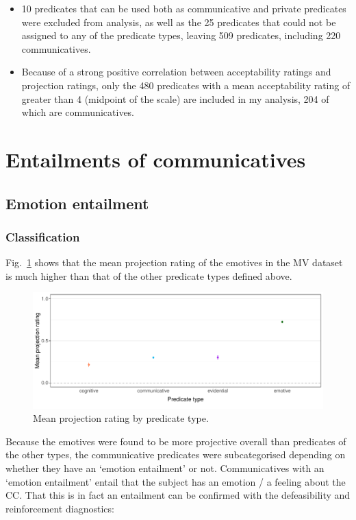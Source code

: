 \documentclass[11pt,fleqn]{article}
\newcommand{\figref}[1]{Fig.~\ref{#1}}
\newcommand{\6}{\mbox{$[\hspace*{-.6mm}[$}}
\newcommand{\9}{\mbox{$]\hspace*{-.6mm}]$}}
\begin{document}
\begin{itemize}
\begin{itemize}
	\end{itemize}
	\item 10 predicates that can be used both as communicative and private predicates were excluded from analysis, as well as the 25 predicates that could not be assigned to any of the predicate types, leaving 509 predicates, including 220 communicatives.
	\item Because of a strong positive correlation between acceptability ratings and projection ratings, only the 480 predicates with a mean acceptability rating of greater than 4 (midpoint of the scale) are included in my analysis, 204 of which are communicatives.
\end{itemize}

\section{Entailments of communicatives}
\subsection{Emotion entailment}
\subsubsection{Classification}
\figref{projpredtype} shows that the mean projection rating of the emotives in the MV dataset is much higher than that of the other predicate types defined above.

\begin{figure}[H]
	\centering
	\includegraphics[width=1\textwidth]{projection-by-predicateType}
	\caption{Mean projection rating by predicate type.}
	\label{projpredtype}
\end{figure}

Because the emotives were found to be more projective overall than predicates of the other types, the communicative predicates were subcategorised depending on whether they have an ‘emotion entailment’ or not. Communicatives with an `emotion entailment' entail that the subject has an emotion / a feeling about the CC. That this is in fact an entailment can be confirmed with the defeasibility and reinforcement diagnostics:
\end{document}
